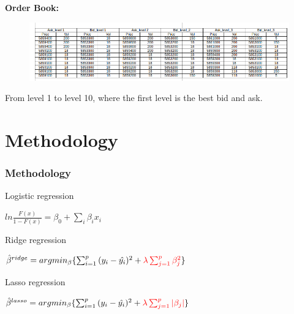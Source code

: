 \documentclass[xcolor={x11names,svgnames,dvipsnames}]{beamer}
\begin{document}
\begin{frame}
	\textbf{Order Book:}
	\begin{figure}
		\includegraphics[width=1\textwidth, height=0.5\textheight]{order_book_new.png}
	\end{figure}
From level \alert{1 to level 10}, where the first level is the best bid and ask.	
\end{frame}




\section{Methodology}

\begin{frame}
\frametitle{Methodology}
%
\begin{block}{Logistic regression}
\begin{center}
$ln{\frac{F(x)}{1-F(x)}}=\beta_0+\sum_i\beta_ix_i$\\
\end{center}
\end{block}

\begin{block}{Ridge regression}
\begin{center}
$\hat{\beta}^{ridge}=argmin_{\beta}\{\sum_{i=1}^p{(y_i-\hat{y_i})^2}+{\color{red}\lambda \sum_{j=1}^p\beta_j^2}\}$
\\
\end{center}
\end{block}

\begin{block}{Lasso regression}
\begin{center}
$\hat{\beta}^{lasso}=argmin_{\beta}\{\sum_{i=1}^p{(y_i-\hat{y_i})^2}+{\color{red}\lambda\sum_{j=1}^p |\beta_j|}\}$\\
\end{center}
\end{block}

\end{frame}
\end{document}
